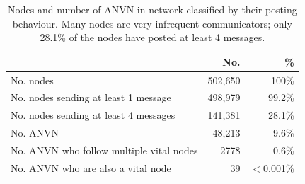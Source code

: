 



\begin{table} 
	\caption{Nodes and number of ANVN in network classified by their posting behaviour. Many nodes are very infrequent communicators; only 28.1\% of the nodes have posted at least 4 messages. }
	\centering
	\begin{tabular}[t]{lrr}
		\hline \hline
		& No. & \% \\
		\hline
		No. nodes& 502,650 & 100\%\\
		No. nodes sending at least 1 message& 498,979& 99.2\%\\
		No. nodes sending at least 4 messages& 141,381 &28.1\%\\
		No. ANVN & 48,213 &9.6\%\\
		No. ANVN who follow multiple vital nodes &   2778&0.6\%\\	 
		No. ANVN who are also a vital node&    39&$<$0.001\%\\
		\hline \hline
	\end{tabular}
	\label{tab:followers}
\end{table}








